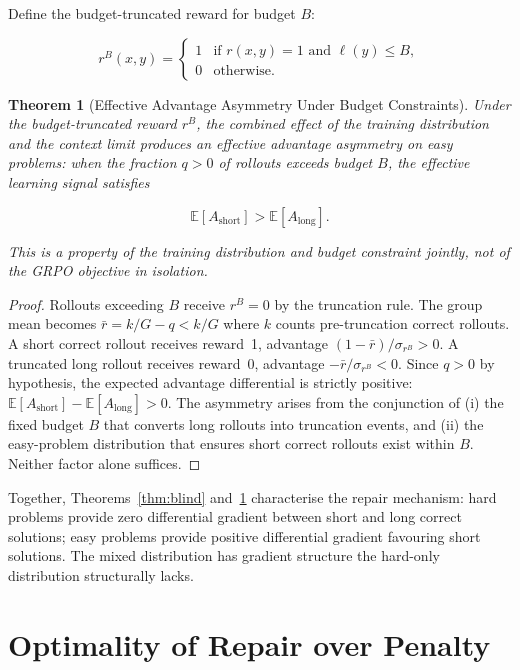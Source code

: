 \documentclass[11pt]{article}
\theoremstyle{rthm}
\newtheorem{theorem}{Theorem}[section]
\theoremstyle{rdef}
\theoremstyle{remark}
\begin{document}
Define the budget-truncated reward for budget $B$:

\[
r^B(x, y) = \begin{cases}
1 & \text{if } r(x,y) = 1 \text{ and } \ell(y) \leq B, \\
0 & \text{otherwise.}
\end{cases}
\]

\begin{theorem}[Effective Advantage Asymmetry Under Budget Constraints]
\label{thm:asymm}
Under the budget-truncated reward $r^B$, the combined effect of the
training distribution and the context limit produces an effective
advantage asymmetry on easy problems: when the fraction $q > 0$
of rollouts exceeds budget $B$, the effective learning signal
satisfies

\[
\mathbb{E}[A_{\mathrm{short}}] > \mathbb{E}[A_{\mathrm{long}}].
\]

This is a property of the training distribution and budget constraint
jointly, not of the GRPO objective in isolation.
\end{theorem}

\begin{proof}
Rollouts exceeding $B$ receive $r^B = 0$ by the truncation rule.
The group mean becomes $\bar{r} = k/G - q < k/G$ where $k$ counts
pre-truncation correct rollouts. A short correct rollout receives
reward~1, advantage $(1-\bar{r})/\sigma_{r^B} > 0$. A truncated
long rollout receives reward~0, advantage $-\bar{r}/\sigma_{r^B}
< 0$. Since $q > 0$ by hypothesis, the expected advantage
differential is strictly positive: $\mathbb{E}[A_{\mathrm{short}}]
- \mathbb{E}[A_{\mathrm{long}}] > 0$. The asymmetry arises from
the conjunction of (i) the fixed budget $B$ that converts long
rollouts into truncation events, and (ii) the easy-problem
distribution that ensures short correct rollouts exist within
$B$. Neither factor alone suffices.
\end{proof}

Together, Theorems~\ref{thm:blind} and~\ref{thm:asymm} characterise
the repair mechanism: hard problems provide zero differential gradient
between short and long correct solutions; easy problems provide
positive differential gradient favouring short solutions. The mixed
distribution has gradient structure the hard-only distribution
structurally lacks.

\section{Optimality of Repair over Penalty}
\label{sec:penalty}
\end{document}
